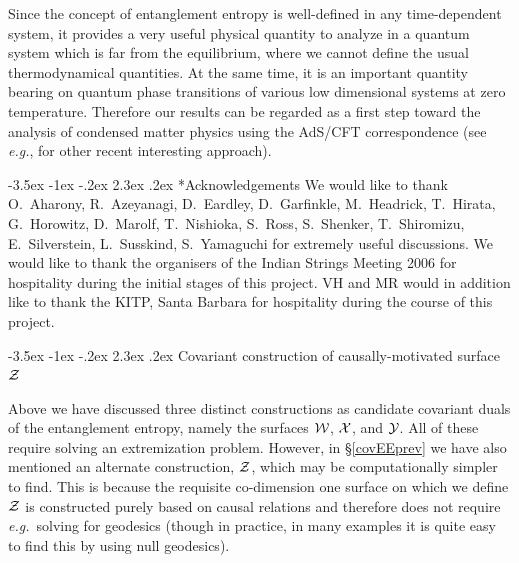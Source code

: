 \documentclass[12pt]{article}
\makeatletter
\renewcommand\section{\@startsection {section}{1}{\z@}%
                                   {-3.5ex \@plus -1ex \@minus -.2ex}%
                                   {2.3ex \@plus.2ex}%
                                   {\normalfont\large\bfseries}}
\def\sec#1{\S \;\ref{#1}}
\def\eg{{\it e.g.}}
\def\CW{{\cal W}}
\def\CX{{\cal X}}
\def\CY{{\cal Y}}
\def\CZ{{\cal Z}}
\def\Gms{\CW}
\def\Lms{\CY}
\def\Xms{\CX}
\def\Cms{\CZ}
\makeatother
\begin{document}
Since the concept of entanglement entropy is well-defined in any
time-dependent system, it provides a very useful physical quantity
to analyze in a quantum system which is far from the equilibrium,
where we cannot define the usual thermodynamical quantities. At the
same time, it is an important quantity bearing on quantum phase
transitions of various low dimensional systems at zero temperature.
Therefore our results can be regarded as a first step toward the
analysis of condensed matter physics using the AdS/CFT
correspondence (see \eg, \cite{Herzog:2007ij} for other recent
interesting approach).





\section*{Acknowledgements}
We would like to thank O.~Aharony, R.~Azeyanagi, D.~Eardley, D.~Garfinkle, M.~Headrick, T.~Hirata, G.~Horowitz, D.~Marolf, T.~Nishioka, S.~Ross,  S.~Shenker, T.~Shiromizu, E.~Silverstein, L.~Susskind, S.~Yamaguchi for extremely useful discussions. We would like to thank the organisers of the Indian Strings Meeting 2006 for hospitality during the initial stages of this project. VH and MR would in addition  like to thank the KITP, Santa Barbara for hospitality during the course of this project.

\appendix
\section{Covariant construction of causally-motivated surface $\Cms$}
\label{3dspl}

Above we have discussed three distinct constructions as candidate covariant duals of the entanglement entropy, namely the surfaces $\Gms$, $\Xms$, and $\Lms$.   All of these require solving an extremization problem.  However, in \sec{covEEprev} we have also mentioned an alternate construction, $\Cms$, which may be computationally simpler to find.  This is because the requisite co-dimension one surface on which we define $\Cms$ is constructed purely based on causal relations and therefore does not require \eg\ solving for geodesics (though in practice, in many examples it is quite easy to find this by using null geodesics).
\end{document}
